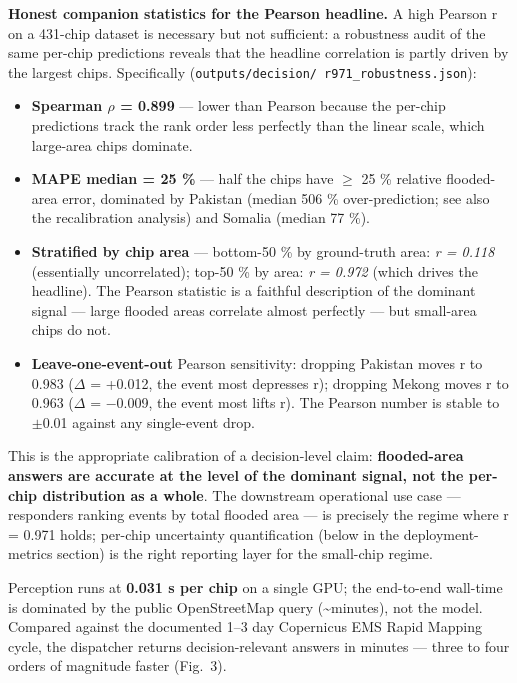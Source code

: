 \documentclass[sn-nature,lineno]{sn-jnl}
\providecommand{\tightlist}{\setlength{\itemsep}{0pt}\setlength{\parskip}{0pt}}
\theoremstyle{thmstyleone}
\theoremstyle{thmstyletwo}
\theoremstyle{thmstylethree}
\begin{document}
\textbf{Honest companion statistics for the Pearson headline.} A high Pearson r
on a 431-chip dataset is necessary but not sufficient: a robustness audit
of the same per-chip predictions reveals that the headline correlation is
partly driven by the largest chips. Specifically (\texttt{outputs/decision/\ r971\_robustness.json}):

\begin{itemize}
\tightlist
\item
  \textbf{Spearman $\rho$ = 0.899} --- lower than Pearson because the per-chip
  predictions track the rank order less perfectly than the linear scale,
  which large-area chips dominate.
\item
  \textbf{MAPE median = 25 \%} --- half the chips have $\geq$ 25 \% relative
  flooded-area error, dominated by Pakistan (median 506 \% over-prediction;
  see also the recalibration analysis) and Somalia (median 77 \%).
\item
  \textbf{Stratified by chip area} --- bottom-50 \% by ground-truth area:
  \emph{r = 0.118} (essentially uncorrelated); top-50 \% by area: \emph{r = 0.972}
  (which drives the headline). The Pearson statistic is a faithful
  description of the dominant signal --- large flooded areas correlate
  almost perfectly --- but small-area chips do not.
\item
  \textbf{Leave-one-event-out} Pearson sensitivity: dropping Pakistan moves r
  to 0.983 ($\Delta$ = +0.012, the event most depresses r); dropping Mekong
  moves r to 0.963 ($\Delta$ = $-$0.009, the event most lifts r). The Pearson
  number is stable to $\pm$0.01 against any single-event drop.
\end{itemize}

This is the appropriate calibration of a decision-level claim:
\textbf{flooded-area answers are accurate at the level of the dominant signal,
not the per-chip distribution as a whole}. The downstream operational
use case --- responders ranking events by total flooded area --- is precisely
the regime where r = 0.971 holds; per-chip uncertainty quantification
(below in the deployment-metrics section) is the right reporting layer for the small-chip regime.

Perception runs at \textbf{0.031 s per chip} on a single GPU; the end-to-end
wall-time is dominated by the public OpenStreetMap query (\textasciitilde minutes), not the
model. Compared against the documented 1--3 day Copernicus EMS Rapid Mapping
cycle, the dispatcher returns decision-relevant answers in minutes --- three to
four orders of magnitude faster (Fig.~3).
\end{document}
